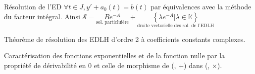 \documentclass{article}
\begin{document}
\begin{question_kholle}{Résolution de l'ED  $\forall t \in J, y' + a_{0}(t) = b(t)$ par équivalences avec la méthode du facteur intégral.}
  Ainsi $\mathcal{S} = \underset{\text{sol. particluière}}{Be^{-A}} + \underset{\text{droite vectorielle des sol. de l'EDLH}}{\left\lbrace \lambda e^{-A} | \lambda \in \mathbb{K}\right\rbrace }$
 
\end{question_kholle}

\begin{question_kholle}{Théorème de résolution des EDLH d'ordre 2 à coefficients constants complexes.}

\end{question_kholle}

\begin{question_kholle}{Caractérisation des fonctions exponentielles et de la fonction nulle par la propriété de dérivabilité en 0 et celle de morphisme de (\R, +) dans (\C, $\times$).}
  
\end{question_kholle}
\end{document}
